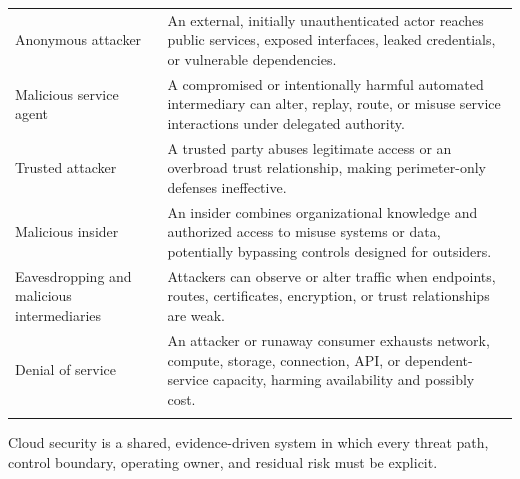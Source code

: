 \documentclass[11pt]{article}
\begin{document}
\begin{longtable}{@{}>{\RaggedRight\arraybackslash}p{}>{\RaggedRight\arraybackslash}p{}@{}}
Anonymous attacker & An external, initially unauthenticated actor reaches public services, exposed interfaces, leaked credentials, or vulnerable dependencies. \\\addlinespace[2pt]
Malicious service agent & A compromised or intentionally harmful automated intermediary can alter, replay, route, or misuse service interactions under delegated authority. \\\addlinespace[2pt]
Trusted attacker & A trusted party abuses legitimate access or an overbroad trust relationship, making perimeter-only defenses ineffective. \\\addlinespace[2pt]
Malicious insider & An insider combines organizational knowledge and authorized access to misuse systems or data, potentially bypassing controls designed for outsiders. \\\addlinespace[2pt]
Eavesdropping and malicious intermediaries & Attackers can observe or alter traffic when endpoints, routes, certificates, encryption, or trust relationships are weak. \\\addlinespace[2pt]
Denial of service & An attacker or runaway consumer exhausts network, compute, storage, connection, API, or dependent-service capacity, harming availability and possibly cost. \\\addlinespace[2pt]
\bottomrule
\end{longtable}
\begin{takeawaybox}
Cloud security is a shared, evidence-driven system in which every threat path, control boundary, operating owner, and residual risk must be explicit.
\end{takeawaybox}
\end{document}
